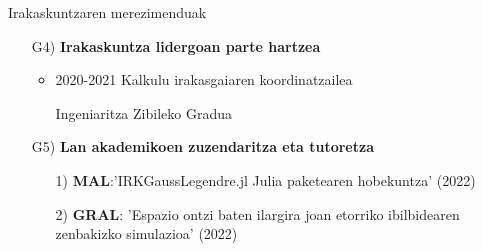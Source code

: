 \documentclass[
 10pt,%
 compress,%
 t,       %
 xcolor=svgnames
]{beamer}
\theoremstyle{definition} \newtheorem{definicion}{Definicion}[section]
\theoremstyle{propiedades} \newtheorem{propiedades}{Propiedades}[section]
\begin{document}
\begin{frame}{Irakaskuntzaren merezimenduak} 

\medskip

\begin{itemize}
\item[G4)] \textbf{Irakaskuntza lidergoan parte hartzea}
%

\medskip
\begin{itemize}
\item 2020-2021 Kalkulu irakasgaiaren koordinatzailea 

Ingeniaritza Zibileko Gradua
\end{itemize}

\bigskip
\item[G5)] \textbf{Lan akademikoen zuzendaritza eta tutoretza} 

\begin{itemize}
	
\medskip
\item[1)] \textbf{MAL}:'IRKGaussLegendre.jl  Julia paketearen hobekuntza' (2022)

\medskip


	

\item[2)] \textbf{GRAL}: 'Espazio ontzi baten ilargira joan etorriko ibilbidearen zenbakizko simulazioa'
(2022)

%





\end{itemize}

\end{itemize}


\end{frame}
\end{document}
